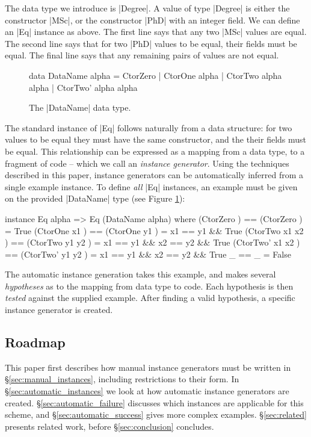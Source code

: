 \documentclass{llncs}
\begin{document}
The data type we introduce is |Degree|. A value of type |Degree| is either the constructor |MSc|, or the constructor |PhD| with an integer field. We can define an |Eq| instance as above. The first line says that any two |MSc| values are equal. The second line says that for two |PhD| values to be equal, their fields must be equal. The final line says that any remaining pairs of values are not equal.

\begin{figure}
\begin{code}
data DataName alpha = CtorZero | CtorOne alpha | CtorTwo alpha alpha | CtorTwo' alpha alpha
\end{code}
\caption{The |DataName| data type.}
\label{fig:dataname}
\end{figure}

The standard instance of |Eq| follows naturally from a data structure: for two values to be equal they must have the same constructor, and the their fields must be equal. This relationship can be expressed as a mapping from a data type, to a fragment of code -- which we call an \textit{instance generator}. Using the techniques described in this paper, instance generators can be automatically inferred from a single example instance. To define \textit{all} |Eq| instances, an example must be given on the provided |DataName| type (see Figure \ref{fig:dataname}):

\begin{code}
instance Eq alpha => Eq (DataName alpha) where
    (CtorZero         )  == (CtorZero         )  = True
    (CtorOne   x1     )  == (CtorOne   y1     )  = x1 == y1 && True
    (CtorTwo   x1 x2  )  == (CtorTwo   y1 y2  )  = x1 == y1 && x2 == y2 && True
    (CtorTwo'  x1 x2  )  == (CtorTwo'  y1 y2  )  = x1 == y1 && x2 == y2 && True
    _                    == _                    = False
\end{code}

The automatic instance generation takes this example, and makes several \textit{hypotheses} as to the mapping from data type to code. Each hypothesis is then \textit{tested} against the supplied example. After finding a valid hypothesis, a specific instance generator is created.

\subsection{Roadmap}

This paper first describes how manual instance generators must be written in \S\ref{sec:manual_instances}, including restrictions to their form. In \S\ref{sec:automatic_instances} we look at how automatic instance generators are created. \S\ref{sec:automatic_failure} discusses which instances are applicable for this scheme, and \S\ref{sec:automatic_success} gives more complex examples. \S\ref{sec:related} presents related work, before \S\ref{sec:conclusion} concludes.
\end{document}
